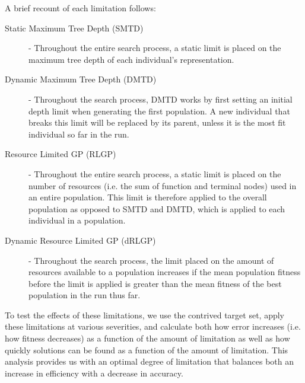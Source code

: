 \documentclass[12pt]{report} 	%
\numberwithin{figure}{chapter}
\numberwithin{table}{chapter}
\numberwithin{equation}{chapter}
\begin{document}
\begin{flushleft}
A brief recount of each limitation follows:

\begin{description}
\item [Static Maximum Tree Depth (SMTD)] - Throughout the entire search process, a static limit is placed on the maximum tree depth of each individual's representation.
\item [Dynamic Maximum Tree Depth (DMTD)] - Throughout the search process, DMTD works by first setting an initial depth limit when generating the first population. A new individual that breaks this limit will be replaced by its parent, unless it is the most fit individual so far in the run.\item [Resource Limited GP (RLGP)] - Throughout the entire search process, a static limit is placed on the number of resources (i.e. the sum of function and terminal nodes) used in an entire population. This limit is therefore applied to the overall population as opposed to SMTD and DMTD, which is applied to each individual in a population.
\item [Dynamic Resource Limited GP (dRLGP)] - Throughout the search process, the limit placed on the amount of resources available to a population increases if the mean population fitness before the limit is applied is greater than the mean fitness of the best population in the run thus far.
\end{description}

To test the effects of these limitations, we use the contrived target set, apply these limitations at various severities, and calculate both how error increases (i.e. how fitness decreases) as a function of the amount of limitation as well as how quickly solutions can be found as a function of the amount of limitation. This analysis provides us with an optimal degree of limitation that balances both an increase in efficiency with a decrease in accuracy.


\end{flushleft}
\end{document}
